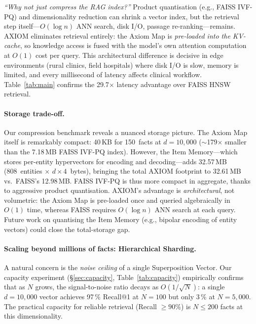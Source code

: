 \documentclass[11pt,a4paper]{article}
\begin{document}
\emph{``Why not just compress the RAG index?''}
Product quantisation (e.g., FAISS IVF-PQ) and dimensionality
reduction can shrink a vector index, but the retrieval step
itself---$O(\log n)$ ANN search, disk I/O, passage re-ranking---remains.
AXIOM eliminates retrieval entirely: the Axiom Map is
\emph{pre-loaded into the KV-cache}, so knowledge access is fused
with the model's own attention computation at $O(1)$ cost per query.
This architectural difference is decisive in edge environments
(rural clinics, field hospitals) where disk I/O is slow, memory is
limited, and every millisecond of latency affects clinical workflow.
Table~\ref{tab:main} confirms the 29.7$\times$ latency advantage
over FAISS HNSW retrieval.

\paragraph{Storage trade-off.}
Our compression benchmark reveals a nuanced storage picture.  The
Axiom Map itself is remarkably compact: 40\,KB for 150~facts at
$d = 10{,}000$ ($\sim$179$\times$ smaller than the 7.18\,MB FAISS
IVF-PQ index).  However, the Item Memory---which stores per-entity
hypervectors for encoding and decoding---adds 32.57\,MB (808~entities
$\times$ $d \times 4$~bytes), bringing the total AXIOM footprint to
32.61\,MB vs.\ FAISS's 12.98\,MB.  FAISS IVF-PQ is thus more compact
in aggregate, thanks to aggressive product quantisation.  AXIOM's
advantage is \emph{architectural}, not volumetric: the Axiom Map is
pre-loaded once and queried algebraically in $O(1)$ time, whereas
FAISS requires $O(\log n)$ ANN search at each query.  Future work on
quantising the Item Memory (e.g., bipolar encoding of entity vectors)
could close the total-storage gap.

\paragraph{Scaling beyond millions of facts: Hierarchical Sharding.}
A natural concern is the \emph{noise ceiling} of a single Superposition
Vector.  Our capacity experiment (\S\ref{sec:capacity},
Table~\ref{tab:capacity}) empirically confirms that as $N$ grows,
the signal-to-noise ratio decays as $O(1/\sqrt{N})$: a single
$d = 10{,}000$ vector achieves 97\,\% Recall@1 at $N = 100$ but only
3\,\% at $N = 5{,}000$.  The practical capacity for reliable retrieval
(Recall $\geq 90\%$) is $N \leq 200$ facts at this dimensionality.
\end{document}
